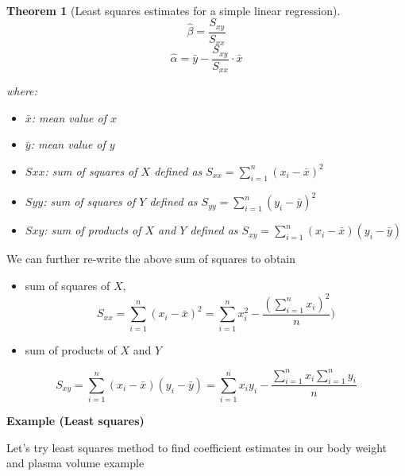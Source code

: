 \documentclass[
]{book}
\providecommand{\tightlist}{%
  \setlength{\itemsep}{0pt}\setlength{\parskip}{0pt}}
\newtheorem{theorem}{Theorem}[chapter]
\theoremstyle{definition}
\theoremstyle{definition}
\theoremstyle{definition}
\theoremstyle{remark}
\begin{document}
~\\
\begin{theorem}[Least squares estimates for a simple linear regression]
\protect\hypertarget{thm:leastsq-01}{}{\label{thm:leastsq-01} {} }
\[\hat{\beta} = \frac{S_{xy}}{S_{xx}}\]
\[\hat{\alpha} = \bar{y}-\frac{S_{xy}}{S_{xx}}\cdot \bar{x}\]

where:

\begin{itemize}
\tightlist
\item
  \(\bar{x}\): mean value of \(x\)
\item
  \(\bar{y}\): mean value of \(y\)
\item
  \(S{xx}\): sum of squares of \(X\) defined as \(S_{xx} = \displaystyle \sum_{i=1}^{n}(x_i-\bar{x})^2\)
\item
  \(S{yy}\): sum of squares of \(Y\) defined as \(S_{yy} = \displaystyle \sum_{i=1}^{n}(y_i-\bar{y})^2\)
\item
  \(S{xy}\): sum of products of \(X\) and \(Y\) defined as \(S_{xy} = \displaystyle \sum_{i=1}^{n}(x_i-\bar{x})(y_i-\bar{y})\)
\end{itemize}
\end{theorem}

We can further re-write the above sum of squares to obtain

\begin{itemize}
\tightlist
\item
  sum of squares of \(X\), \[S_{xx} = \displaystyle \sum_{i=1}^{n}(x_i-\bar{x})^2 = \sum_{i=1}^{n}x_i^2-\frac{(\sum_{i=1}^{n}x_i)^2}{n})\]
\item
  sum of products of \(X\) and \(Y\)
\end{itemize}

\[S_{xy} = \displaystyle \sum_{i=1}^{n}(x_i-\bar{x})(y_i-\bar{y})=\sum_{i=1}^nx_iy_i-\frac{\sum_{i=1}^{n}x_i\sum_{i=1}^{n}y_i}{n}\]

\textbf{Example (Least squares)}

Let's try least squares method to find coefficient estimates in our body weight and plasma volume example
\end{document}
